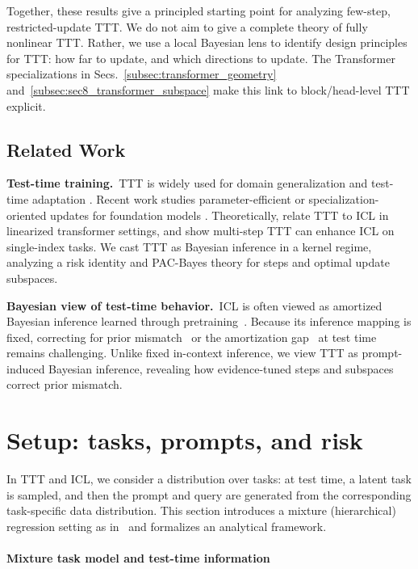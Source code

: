 \documentclass{article}
\theoremstyle{plain}
\theoremstyle{definition}
\theoremstyle{remark}
\begin{document}
Together, these results give a principled starting point for analyzing few-step, restricted-update TTT. We do not aim to give a complete theory of fully nonlinear TTT. Rather, we use a local Bayesian lens to identify design principles for TTT: how far to update, and which directions to update. The Transformer specializations in Secs.~\ref{subsec:transformer_geometry} and~\ref{subsec:sec8_transformer_subspace} make this link to block/head-level TTT explicit.

\subsection{Related Work}
\textbf{Test-time training.}\,
TTT is widely used for domain generalization and test-time adaptation \citep{SunEtAl2020TTT,pmlr-v162-niu22a}. Recent work studies parameter-efficient or specialization-oriented updates for foundation models \citep{hubotter2025specialization}. Theoretically, \citet{gozeten2025testtime} relate TTT to ICL in linearized transformer settings, and \citet{kuwataka2025test} show multi-step TTT can enhance ICL on single-index tasks. We cast TTT as Bayesian inference in a kernel regime, analyzing a risk identity and PAC-Bayes theory for steps and optimal update subspaces.

\textbf{Bayesian view of test-time behavior.}\,
ICL is often viewed as amortized Bayesian inference learned through pretraining~\citep{reuter2025transformers,mittal2025amortized}. Because its inference mapping is fixed, correcting for prior mismatch~\citep{wakayama2025context} or the amortization gap~\citep{margossian2024amortized} at test time remains challenging. Unlike fixed in-context inference, we view TTT as prompt-induced Bayesian inference, revealing how evidence-tuned steps and subspaces correct prior mismatch.


\section{Setup: tasks, prompts, and risk}
\label{sec:decision_theory}
In TTT and ICL, we consider a distribution over tasks: at test time, a latent task is sampled, and then the prompt and query are generated from the corresponding task-specific data distribution. This section introduces a mixture (hierarchical) regression setting as in~\citet{wakayama2025context} and formalizes an analytical framework. 

\paragraph{Mixture task model and test-time information}
\end{document}
